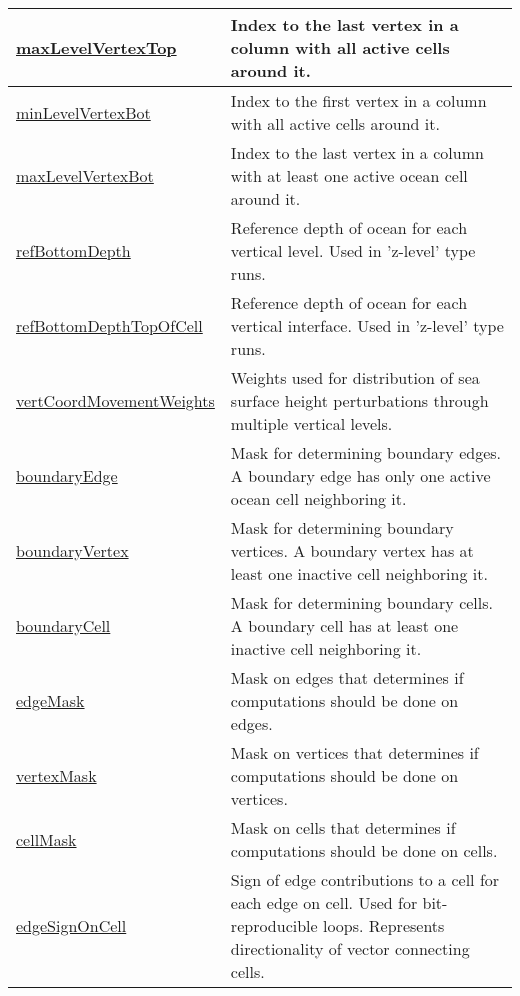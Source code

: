 {\begin{center}
\begin{longtable}{| p{2.0in} | p{4.0in} |}
    \hline
    \hyperref[subsec:var_sec_mesh_maxLevelVertexTop]{maxLevelVertexTop} & Index to the last vertex in a column with all active cells around it. \\
    \hline
    \hyperref[subsec:var_sec_mesh_minLevelVertexBot]{minLevelVertexBot} & Index to the first vertex in a column with all active cells around it. \\
    \hline
    \hyperref[subsec:var_sec_mesh_maxLevelVertexBot]{maxLevelVertexBot} & Index to the last vertex in a column with at least one active ocean cell around it. \\
    \hline
    \hyperref[subsec:var_sec_mesh_refBottomDepth]{refBottomDepth} & Reference depth of ocean for each vertical level. Used in 'z-level' type runs. \\
    \hline
    \hyperref[subsec:var_sec_mesh_refBottomDepthTopOfCell]{refBottomDepthTopOfCell} & Reference depth of ocean for each vertical interface. Used in 'z-level' type runs. \\
    \hline
    \hyperref[subsec:var_sec_mesh_vertCoordMovementWeights]{vertCoordMovementWeights} & Weights used for distribution of sea surface height perturbations through multiple vertical levels. \\
    \hline
    \hyperref[subsec:var_sec_mesh_boundaryEdge]{boundaryEdge} & Mask for determining boundary edges. A boundary edge has only one active ocean cell neighboring it. \\
    \hline
    \hyperref[subsec:var_sec_mesh_boundaryVertex]{boundaryVertex} & Mask for determining boundary vertices. A boundary vertex has at least one inactive cell neighboring it. \\
    \hline
    \hyperref[subsec:var_sec_mesh_boundaryCell]{boundaryCell} & Mask for determining boundary cells. A boundary cell has at least one inactive cell neighboring it. \\
    \hline
    \hyperref[subsec:var_sec_mesh_edgeMask]{edgeMask} & Mask on edges that determines if computations should be done on edges. \\
    \hline
    \hyperref[subsec:var_sec_mesh_vertexMask]{vertexMask} & Mask on vertices that determines if computations should be done on vertices. \\
    \hline
    \hyperref[subsec:var_sec_mesh_cellMask]{cellMask} & Mask on cells that determines if computations should be done on cells. \\
    \hline
    \hyperref[subsec:var_sec_mesh_edgeSignOnCell]{edgeSignOnCell} & Sign of edge contributions to a cell for each edge on cell. Used for bit-reproducible loops. Represents directionality of vector connecting cells. \\

\end{longtable}
\end{center}}
